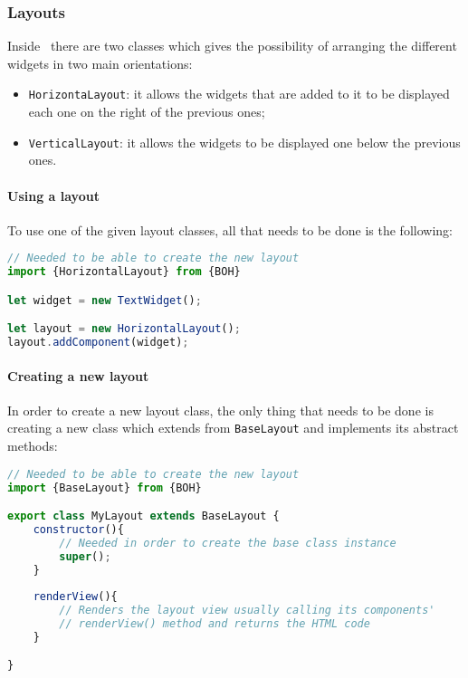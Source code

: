 \subsubsection{Layouts}
Inside \progettoShort\ there are two classes which gives the possibility of arranging the different widgets in two main orientations:
\begin{itemize}
	\item \texttt{HorizontaLayout}: it allows the widgets that are added to it to be displayed each one on the right of the previous ones;
	\item \texttt{VerticalLayout}: it allows the widgets to be displayed one below the previous ones.
\end{itemize}

\paragraph{Using a layout}
To use one of the given layout classes, all that needs to be done is the following:

\begin{lstlisting}[language=JavaScript, frame=single]
// Needed to be able to create the new layout
import {HorizontalLayout} from {BOH}

let widget = new TextWidget();

let layout = new HorizontalLayout();
layout.addComponent(widget);
\end{lstlisting}

\paragraph{Creating a new layout}
In order to create a new layout class, the only thing that needs to be done is creating a new class which extends from \texttt{BaseLayout} and implements its abstract methods:
\begin{lstlisting}[language=JavaScript, frame=single]
// Needed to be able to create the new layout
import {BaseLayout} from {BOH}

export class MyLayout extends BaseLayout {
    constructor(){
        // Needed in order to create the base class instance
        super();
    }
    
    renderView(){
        // Renders the layout view usually calling its components' 
        // renderView() method and returns the HTML code
    }

}
\end{lstlisting}